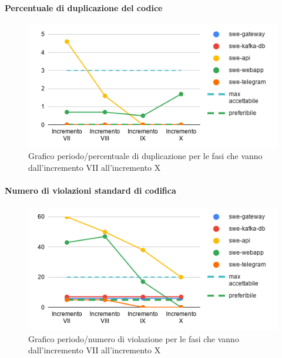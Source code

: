 \paragraph{Percentuale di duplicazione del codice}
\begin{figure}[H]
			\centering
			\includegraphics[width=0.8\linewidth]{./res/images/QM-PROD-15-DUPC.png}
			\caption{Grafico periodo/percentuale di duplicazione per le fasi che vanno dall'incremento VII all'incremento X}
			\label{fig:Grafico periodo/percentuale di duplicazione per le fasi che vanno dall'incremento VII all'incremento X}
	\end{figure}
\paragraph{Numero di violazioni standard di codifica}
\begin{figure}[H]
			\centering
			\includegraphics[width=0.8\linewidth]{./res/images/QM-PROD-16-NVSC.png}
			\caption{Grafico periodo/numero di violazione per le fasi che vanno dall'incremento VII all'incremento X}
			\label{fig:Grafico periodo/numero di violazione per le fasi che vanno dall'incremento VII all'incremento X}
	\end{figure}

